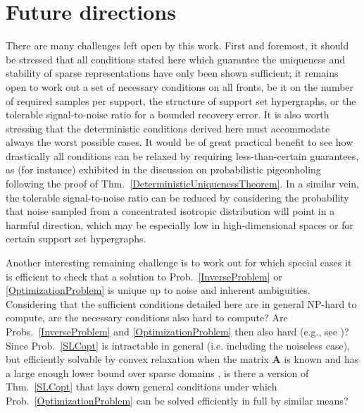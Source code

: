 
\section{Future directions}\label{FutureDirections}

There are many challenges left open by this work. First and foremost, it should be stressed that all conditions stated here which guarantee the uniqueness and stability of sparse representations have only been shown sufficient; it remains open to work out a set of necessary conditions on all fronts, be it on the number of required samples per support, the structure of support set hypergraphs, or the tolerable signal-to-noise ratio for a bounded recovery error. It is also worth stressing that the deterministic conditions derived here must accommodate always the worst possible cases. It would be of great practical benefit to see how drastically all conditions can be relaxed by requiring less-than-certain guarantees, as (for instance) exhibited in the discussion on probabilistic pigeonholing following the proof of Thm.~\ref{DeterministicUniquenessTheorem}. In a similar vein, the tolerable signal-to-noise ratio can be reduced by considering the probability that noise sampled from a concentrated isotropic distribution will point in a harmful direction, which may be especially low in high-dimensional spaces or for certain support set hypergraphs.

Another interesting remaining challenge is to work out for which special cases it is efficient to check that a solution to Prob.~\ref{InverseProblem} or \ref{OptimizationProblem} is unique up to noise and inherent ambiguities. Considering that the sufficient conditions detailed here are in general NP-hard to compute, are the necessary conditions also hard to compute? Are Probs.~\ref{InverseProblem} and \ref{OptimizationProblem} then also hard (e.g., see \cite{tillmann2015computational})? Since Prob.~\ref{SLCopt} is intractable in general (i.e. including the noiseless case), but efficiently solvable by convex relaxation when the matrix $\mathbf{A}$ is known and has a large enough lower bound over sparse domains \cite{eldar2012compressed}, is there a version of Thm.~\ref{SLCopt} that lays down general conditions under which Prob.~\ref{OptimizationProblem} can be solved efficiently in full by similar means?  %


